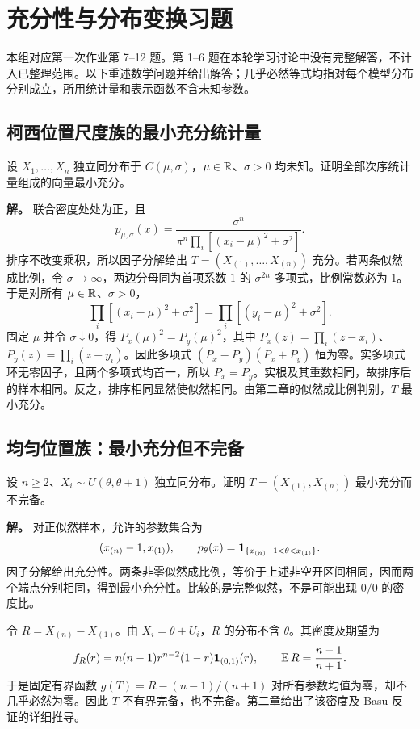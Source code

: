 \chapter{充分性与分布变换习题}

本组对应第一次作业第 7--12 题。第 1--6 题在本轮学习讨论中没有完整解答，不计入已整理范围。以下重述数学问题并给出解答；几乎必然等式均指对每个模型分布分别成立，所用统计量和表示函数不含未知参数。

\section{柯西位置尺度族的最小充分统计量}
设 $X_1,\ldots,X_n$ 独立同分布于 $C(\mu,\sigma)$，$\mu\in\mathbb R$、$\sigma>0$ 均未知。证明全部次序统计量组成的向量最小充分。

\textbf{解。} 联合密度处处为正，且
\[
 p_{\mu,\sigma}(x)=\frac{\sigma^n}{\pi^n\prod_i[(x_i-\mu)^2+\sigma^2]}.
\]
排序不改变乘积，所以因子分解给出 $T=(X_{(1)},\ldots,X_{(n)})$ 充分。若两条似然成比例，令 $\sigma\to\infty$，两边分母同为首项系数 $1$ 的 $\sigma^{2n}$ 多项式，比例常数必为 $1$。于是对所有 $\mu\in\mathbb R$、$\sigma>0$，
\[
 \prod_i[(x_i-\mu)^2+\sigma^2]
 =\prod_i[(y_i-\mu)^2+\sigma^2].
\]
固定 $\mu$ 并令 $\sigma\downarrow0$，得 $P_x(\mu)^2=P_y(\mu)^2$，其中
$P_x(z)=\prod_i(z-x_i)$、$P_y(z)=\prod_i(z-y_i)$。因此多项式
$(P_x-P_y)(P_x+P_y)$ 恒为零。实多项式环无零因子，且两个多项式均首一，所以 $P_x=P_y$。实根及其重数相同，故排序后的样本相同。反之，排序相同显然使似然相同。由第二章的似然成比例判别，$T$ 最小充分。

\section{均匀位置族：最小充分但不完备}
设 $n\ge2$、$X_i\sim U(\theta,\theta+1)$ 独立同分布。证明 $T=(X_{(1)},X_{(n)})$ 最小充分而不完备。

\textbf{解。} 对正似然样本，允许的参数集合为
\[
 (x_{(n)}-1,x_{(1)}),\qquad
 p_\theta(x)=\mathbf 1_{\{x_{(n)}-1<\theta<x_{(1)}\}}.
\]
因子分解给出充分性。两条非零似然成比例，等价于上述非空开区间相同，因而两个端点分别相同，得到最小充分性。比较的是完整似然，不是可能出现 $0/0$ 的密度比。

令 $R=X_{(n)}-X_{(1)}$。由 $X_i=\theta+U_i$，$R$ 的分布不含 $\theta$。其密度及期望为
\[
 f_R(r)=n(n-1)r^{n-2}(1-r)\mathbf 1_{(0,1)}(r),\qquad
 \operatorname{E} R=\frac{n-1}{n+1}.
\]
于是固定有界函数 $g(T)=R-(n-1)/(n+1)$ 对所有参数均值为零，却不几乎必然为零。因此 $T$ 不有界完备，也不完备。第二章给出了该密度及 Basu 反证的详细推导。

